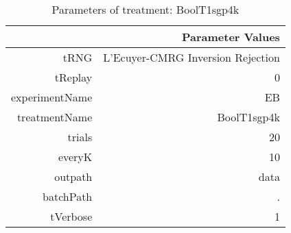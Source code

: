 \begin{table}[ht]
\centering
\begin{tabular}{rr}
  \hline
 & Parameter Values \\ 
  \hline
tRNG & L'Ecuyer-CMRG Inversion Rejection \\ 
  tReplay & 0 \\ 
  experimentName & EB \\ 
  treatmentName & BoolT1sgp4k \\ 
  trials & 20 \\ 
  everyK & 10 \\ 
  outpath & data \\ 
  batchPath & . \\ 
  tVerbose & 1 \\ 
   \hline
\end{tabular}
\caption{ Parameters of treatment: BoolT1sgp4k 
} 
\end{table}
